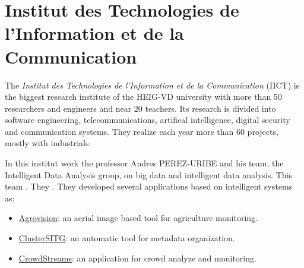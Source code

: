\documentclass[12pt, a4paper]{report}
\begin{document}
		\section{Institut des Technologies de l’Information et de la Communication}
			The {\itshape Institut des Technologies de l’Information et de la Communication} (IICT) is the biggest research institute of the HEIG-VD university with more than 50 researchers and engineers and near 20 teachers.
			Its research is divided into software engineering, telecommunications, artifical intelligence, digital security and communication systems.
			They realize each year more than 60 projects, mostly with industrials.
			\par
			In this institut work the professor Andres PEREZ-URIBE and his team, the Intelligent Data Analysis group, on big data and intelligent data analysis.
			This team .
			They .
			They developed several applications based on intelligent systems as:
			\begin{itemize}
				\item \href{http://iict.heig-vd.ch/projets#/49/agrovision-developpement-dun-outil-de-suivi-base-sur-limagerie-aerienne-a-haute-resolution-pour-une-meilleure-gestion-agronomique-et-environnementale-de-lagriculture}{Agrovision}: an aerial image based tool for agriculture monitoring.
				\item \href{http://iict.heig-vd.ch/projets#/47/clustersitg-semantic-analysis-and-clustering-of-sitg-catalogue}{ClusterSITG}: an automatic tool for metadata organization.
				\item \href{http://iict.heig-vd.ch/projets#/43/crowdstreams-analyse-et-surveillance-en-temps-r-el-de-mobilit-la-proximit-des-grands-v-nements}{CrowdStreams}: an application for crowd analyze and monitoring.
			\end{itemize}
\end{document}

